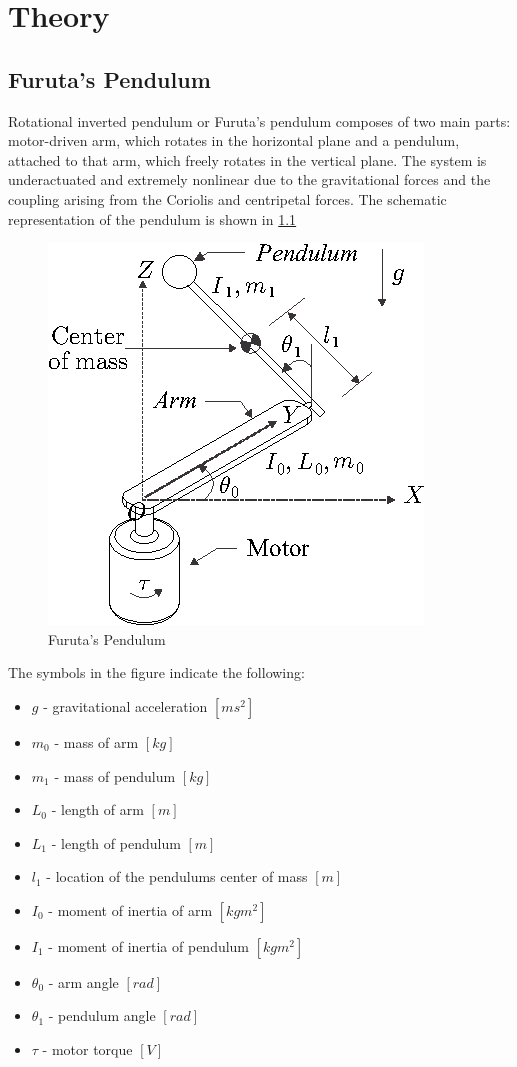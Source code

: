 \chapter{Theory}

\section{Furuta's Pendulum}

Rotational inverted pendulum or Furuta’s pendulum composes of two main parts: motor-driven arm, which rotates in the horizontal plane and a pendulum, attached to that arm, which freely rotates in the vertical plane. The system is underactuated and extremely nonlinear due to the gravitational forces and the coupling arising from the Coriolis and centripetal forces. The schematic representation of the pendulum is shown in \ref{furuta}
\begin{figure}[h]
	\centering
	\includegraphics[width=.6\linewidth]{images/furuta}
	\caption{Furuta's Pendulum}
	\label{furuta}
\end{figure}
\newpage
The symbols in the figure indicate the following:
\begin{itemize}
	\item \textbf{$g$} - gravitational acceleration $[ms^2]$
	\item \textbf{$m_0$} - mass of arm $[kg]$
	\item \textbf{$m_1$} - mass of pendulum $[kg]$
	\item \textbf{$L_0$} - length of arm $[m]$
	\item \textbf{$L_1$} - length of pendulum $[m]$
	\item \textbf{$l_1$} - location of the pendulums center of mass $[m]$
	\item \textbf{$I_0$} - moment of inertia of arm $[kgm^2]$
	\item \textbf{$I_1$} - moment of inertia of pendulum $[kgm^2]$
	\item \textbf{$\theta_0$} - arm angle $[rad]$
	\item \textbf{$\theta_1$} - pendulum angle $[rad]$
	\item \textbf{$\tau$} - motor torque $[V]$
\end{itemize}
